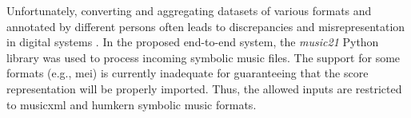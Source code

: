 

Unfortunately, converting and aggregating datasets of
various formats and annotated by different persons often
leads to discrepancies and misrepresentation in digital
systems \parencite{napoleslopez2018encoding,
napoleslopez2019effects}. In the proposed end-to-end system,
the \emph{music21} Python library
\parencite{cuthbert2010music21} was used to process incoming
symbolic music files. The support for some formats (e.g.,
\gls{mei}) is currently inadequate for guaranteeing that the
score representation will be properly imported. Thus, the
allowed inputs are restricted to \gls{musicxml} and
\gls{humkern} symbolic music formats.
